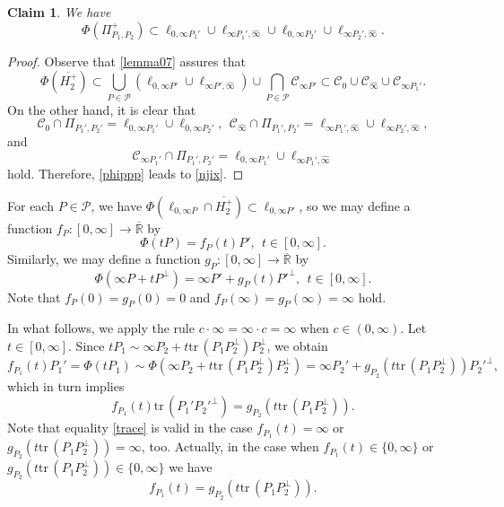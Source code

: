 \documentclass[10pt]{amsart}
\newtheorem{claim}[theorem]{Claim}
\theoremstyle{definition}
\theoremstyle{remark}
\numberwithin{subsection}{section}
\numberwithin{equation}{section}
\newcommand\cC{{\mathcal{C}}}
\newcommand\cP{{\mathcal{P}}}
\newcommand\oHp{{\overline{H_2^+}}}
\newcommand\oi{{\widehat{\infty}}}
\newcommand\oR{{\overline{\mathbb{R}}}}
\newcommand\ppp{{\Pi_{P_1,P_2}^+}}
\begin{document}
\begin{claim}
We have
\begin{equation}\label{njix}
\Phi(\ppp)\subset \ell_{0, \infty P_1'}\cup \ell_{\infty P_1', \oi}\cup \ell_{0, \infty P_2'}\cup \ell_{\infty P_2', \oi}.
\end{equation}
\end{claim}
\begin{proof}
Observe that \eqref{lemma07} assures that 
\[
\Phi(\oHp)\subset \bigcup_{P\in \cP}(\ell_{0, \infty P'}\cup \ell_{\infty P', \oi}) \cup \bigcap_{P\in \cP} \cC_{\infty P'}\subset \cC_0\cup \cC_\oi \cup \cC_{\infty P_1'}.
\]
On the other hand, it is clear that 
\[
\cC_0 \cap \Pi_{P_1',P_2'} = \ell_{0, \infty P_1'} \cup \ell_{0, \infty P_2'}, \ \ \cC_{\oi} \cap \Pi_{P_1',P_2'} = \ell_{ \infty P_1', \oi} \cup \ell_{\infty P_2', \oi},
\]
and
\[
\mathcal{C}_{\infty P_1'} \cap \Pi_{P_1',P_2'} = \ell_{0, \infty P_1'} \cup \ell_{ \infty P_1', \oi}
\]
hold.
Therefore, \eqref{phippp} leads to \eqref{njix}.
\end{proof}

For each $P\in \cP$, we have $\Phi(\ell_{0, \infty P}\cap \oHp)\subset\ell_{0, \infty P'}$, so we may define a function $f_P\colon [0,\infty]\to {\oR}$  by 
\[
\Phi(tP)=f_P(t)P',\ \ t\in [0,\infty].
\] 
Similarly, we may define a function $g_P\colon [0,\infty]\to {\oR}$  by 
\[
\Phi(\infty P+tP^\perp)=\infty P'+ g_P(t){P'}^\perp, \ \ t\in [0,\infty].
\]
Note that $f_P(0)=g_P(0)=0$ and $f_P(\infty)=g_P(\infty)=\infty$ hold. 

In what follows, we apply the rule $c\cdot \infty = \infty\cdot c=\infty$ when $c\in (0, \infty)$.
Let $t\in [0, \infty]$.
Since $tP_1\sim \infty P_2 + t\mathrm{tr}\,(P_1P_2^\perp) P_2^\perp$, we obtain
\[
f_{P_1}(t)P_1' = \Phi(tP_1)\sim \Phi(\infty P_2 + t\mathrm{tr}\,(P_1P_2^\perp) P_2^\perp) = \infty P_2' + g_{P_2}(t\mathrm{tr}\,(P_1P_2^\perp)){P_2'}^\perp,
\]
which in turn implies 
\begin{equation}\label{trace}
f_{P_1}(t) \mathrm{tr}\,(P_1'{P_2'}^\perp) = g_{P_2}(t\mathrm{tr}\,(P_1P_2^\perp)).
\end{equation}
Note that equality \eqref{trace} is valid in the case $f_{P_1}(t)=\infty$ or $g_{P_2}(t\mathrm{tr}\,(P_1P_2^\perp))=\infty$, too. 
Actually, in the case when $f_{P_1}(t) \in \{ 0, \infty \}$ or $g_{P_2}(t \mathrm{tr}\,(P_1P_2^\perp)) \in \{ 0, \infty \}$ we have
\begin{equation}\label{trace2}
f_{P_1}(t)  = g_{P_2}(t\mathrm{tr}\,(P_1P_2^\perp)).
\end{equation}
\end{document}
